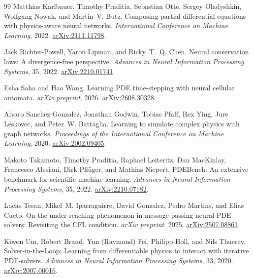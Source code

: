 \begin{thebibliography}{99}
Matthias Karlbauer, Timothy Praditia, Sebastian Otte, Sergey Oladyshkin, Wolfgang Nowak, and Martin~V. Butz.
Composing partial differential equations with physics-aware neural networks.
\emph{International Conference on Machine Learning}, 2022.
\href{https://arxiv.org/abs/2111.11798}{arXiv:2111.11798}.

Jack Richter-Powell, Yaron Lipman, and Ricky~T.~Q. Chen.
Neural conservation laws: A divergence-free perspective.
\emph{Advances in Neural Information Processing Systems}, 35, 2022.
\href{https://arxiv.org/abs/2210.01741}{arXiv:2210.01741}.

Esha Saha and Hao Wang.
Learning PDE time-stepping with neural cellular automata.
\emph{arXiv preprint}, 2026. \href{https://arxiv.org/abs/2608.30328}{arXiv:2608.30328}.

Alvaro Sanchez-Gonzalez, Jonathan Godwin, Tobias Pfaff, Rex Ying,
Jure Leskovec, and Peter~W. Battaglia.
Learning to simulate complex physics with graph networks.
\emph{Proceedings of the International Conference on Machine Learning}, 2020.
\href{https://arxiv.org/abs/2002.09405}{arXiv:2002.09405}.

Makoto Takamoto, Timothy Praditia, Raphael Leiteritz, Dan MacKinlay,
Francesco Alesiani, Dirk Pfl\"uger, and Mathias Niepert.
PDEBench: An extensive benchmark for scientific machine learning.
\emph{Advances in Neural Information Processing Systems}, 35, 2022.
\href{https://arxiv.org/abs/2210.07182}{arXiv:2210.07182}.

Lucas Tesan, Mikel~M. Iparraguirre, David Gonzalez, Pedro Martins, and Elias Cueto.
On the under-reaching phenomenon in message-passing neural PDE solvers:
Revisiting the CFL condition.
\emph{arXiv preprint}, 2025. \href{https://arxiv.org/abs/2507.08861}{arXiv:2507.08861}.

Kiwon Um, Robert Brand, Yun (Raymond) Fei, Philipp Holl, and Nils Thuerey.
Solver-in-the-Loop: Learning from differentiable physics to interact with iterative
PDE-solvers.
\emph{Advances in Neural Information Processing Systems}, 33, 2020.
\href{https://arxiv.org/abs/2007.00016}{arXiv:2007.00016}.


\end{thebibliography}
